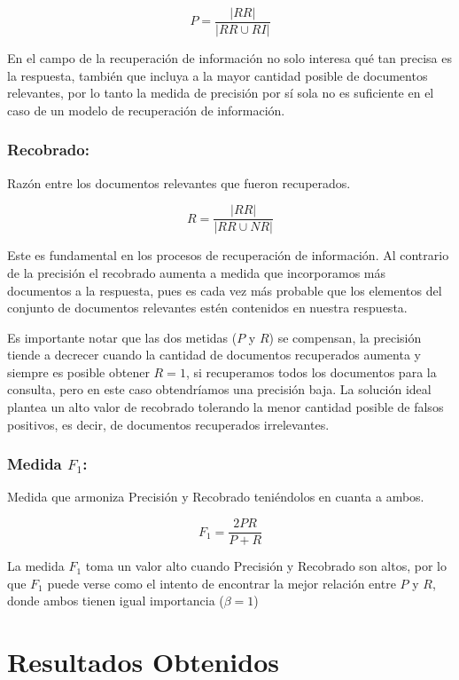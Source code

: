 \documentclass[runningheads,a4paper]{llncs}
\begin{document}
\begin{equation}
	P = \frac{|RR|}{|RR \cup RI|}
\end{equation}

En el campo de la recuperación de información no solo interesa qué tan precisa es la
respuesta, también que incluya a la mayor cantidad posible de documentos
relevantes, por lo tanto la medida de precisión por sí sola no es suficiente en
el caso de un modelo de recuperación de información.

\subsubsection*{Recobrado:} Razón entre los documentos relevantes que fueron recuperados.

\begin{equation}
	R = \frac{|RR|}{|RR \cup NR|}
\end{equation}

Este es fundamental en los procesos de
recuperación de información. Al contrario de la precisión el recobrado
aumenta a medida que incorporamos más documentos a la respuesta, pues es
cada vez más probable que los elementos del conjunto de documentos relevantes
estén contenidos en nuestra respuesta.

Es importante notar que las dos metidas ($P$ y $R$) se compensan, la precisión tiende a decrecer cuando la cantidad
de documentos recuperados aumenta y siempre es posible obtener $R = 1$, si recuperamos todos los documentos para la consulta, pero en este caso obtendríamos una precisión baja. La solución ideal plantea un alto valor de recobrado tolerando la menor cantidad posible de falsos positivos, es decir, de documentos recuperados irrelevantes.

\subsubsection*{Medida $F_1$:} Medida que armoniza Precisión y Recobrado teniéndolos en cuanta a ambos.

\begin{equation}
	F_1 = \frac{2 PR}{P + R}
\end{equation}

La medida $F_1$ toma un valor alto cuando Precisión y Recobrado son altos, por lo que $F_1$ puede verse como el intento de encontrar la mejor relación entre $P$ y $R$, donde ambos tienen igual importancia ($\beta = 1$)

\section{Resultados Obtenidos}
\end{document}
